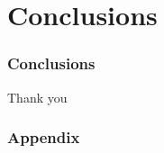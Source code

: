 \documentclass[xcolor=dvipsnames]{beamer}
\begin{document}
\section{Conclusions}

\begin{frame}
\tableofcontents[sectionstyle=show,square,currentsection]
\end{frame}

\begin{frame}
\frametitle{Conclusions}
\end{frame}

\begin{frame}
\Huge{\centerline{Thank you}}
\end{frame}

\begin{frame}
\frametitle{Appendix}


\end{frame}

\end{document}
